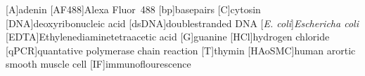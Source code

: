 \begin{acronym}
[A]{adenin}
[AF488]{Alexa Fluor\textsuperscript{\textregistered}~488}
[bp]{basepairs}
[C]{cytosin}
[DNA]{deoxyribonucleic acid}
[dsDNA]{doublestranded DNA}
[\textit{E. coli}]{\textit{Eschericha coli}}
[EDTA]{Ethylenediaminetetraacetic acid}
[G]{guanine}
[HCl]{hydrogen chloride}
[qPCR]{quantative polymerase chain reaction}
[T]{thymin}
[HAoSMC]{human arortic smooth muscle cell}
[IF]{immunoflourescence}
\end{acronym}

